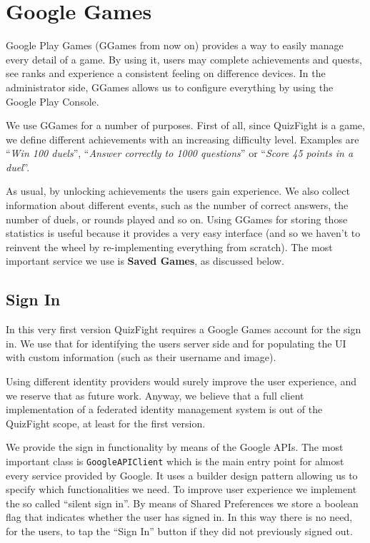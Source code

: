\section{Google Games}

Google Play Games (GGames from now on) provides a way to easily manage every
detail of a game. By using it, users may complete achievements and quests,
see ranks and experience a consistent feeling on difference devices.
In the administrator side, GGames allows us to configure everything by using
the Google Play Console.

We use GGames for a number of purposes. First of all, since QuizFight is a
game, we define different achievements with an increasing difficulty level.
Examples are ``\textit{Win 100 duels}'', ``\textit{Answer correctly to 1000
questions}'' or ``\textit{Score 45 points in a duel}''.

As usual, by unlocking achievements the users gain experience.
We also collect information about different events, such as the number of
correct answers, the number of duels, or rounds played and so on.
Using GGames for storing those statistics is useful because it provides a
very easy interface (and so we haven't to reinvent the wheel by re-implementing
everything from scratch).
The most important service we use is \textbf{Saved Games}, as discussed below.

\subsection{Sign In}

In this very first version QuizFight requires a Google Games account for the
sign in. We use that for identifying the users server side and for populating
the UI with custom information (such as their username and image).

Using different identity providers would surely improve the user experience,
and we reserve that as future work.
Anyway, we believe that a full client implementation of a federated identity
management system is out of the QuizFight scope, at least for the first
version.

We provide the sign in functionality by means of the Google APIs.
The most important class is \texttt{GoogleAPIClient} which is the main entry
point for almost every service provided by Google.
It uses a builder design pattern allowing us to specify which functionalities
we need.
To improve user experience we implement the so called ``silent sign in''.
By means of Shared Preferences we store a boolean flag that indicates whether
the user has signed in.
In this way there is no need, for the users, to tap the ``Sign In'' button if
they did not previously signed out. 

